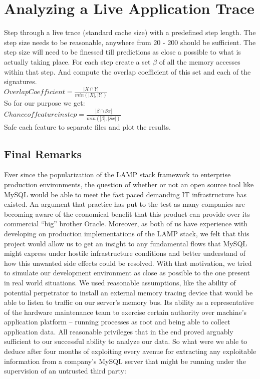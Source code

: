 \documentclass[11pt,a4paper, titlepage, oneside]{article}
\begin{document}
\section{Analyzing a Live Application Trace}
Step through a live trace (standard cache size) with a predefined step length. The step size needs to be reasonable, anywhere from 20 - 200 should be sufficient. The step size will need to be finessed till predictions as close a possible to what is actually taking place. For each step create a set $\beta$ of all the memory accesses within that step. And compute the overlap coefficient of this set and each of the signatures. \\
$Overlap Coefficient = \frac{|X\cap Y|}{min(|X|,|Y|)}$ \\
So for our purpose we get: \\
$Chance of feature in step = \frac{|\beta\cap Sx|}{min(|\beta|, |Sx|)}$ \\
Safe each feature to separate files and plot the results.

\subsection{Final Remarks}
Ever since the popularization of the LAMP stack framework to enterprise production environments, the question of whether or not an open source tool like MySQL would be able to meet the fast paced demanding IT infrastructure has existed. An argument that practice has put to the test as many companies are becoming aware of the economical benefit that this product can provide over its commercial “big” brother Oracle. Moreover, as both of us have experience with developing on production implementations of the LAMP stack, we felt that this project would allow us to get an insight to any fundamental flows that MySQL might express under hostile infrastructure conditions and better understand of how this unwanted side effects could be resolved. With that motivation, we tried to simulate our development environment as close as possible to the one present in real world situations. We used reasonable assumptions, like the ability of potential perpetrator to install an external memory tracing device that would be able to listen to traffic on our server's memory bus. Its ability as a representative of the hardware maintenance team to exercise certain authority over machine's application platform – running processes as root and being able to collect application data. All reasonable privileges that in the end proved arguably sufficient to our successful ability to analyze our data.
So what were we able to deduce after four months of exploiting every avenue for extracting any exploitable information from a company's MySQL server that might be running under the supervision of an untrusted third party:
\end{document}
